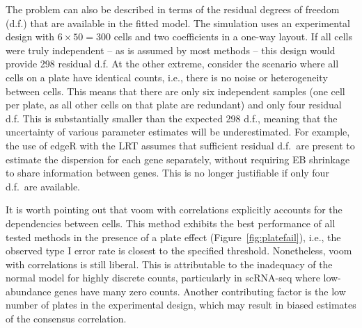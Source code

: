 \documentclass[oupdraft]{bio}
\begin{document}
The problem can also be described in terms of the residual degrees of freedom (d.f.) that are available in the fitted model.
The simulation uses an experimental design with $6 \times 50 =  300$ cells and two coefficients in a one-way layout.
If all cells were truly independent -- as is assumed by most methods -- this design would provide 298 residual d.f. 
At the other extreme, consider the scenario where all cells on a plate have identical counts, i.e., there is no noise or heterogeneity between cells.
This means that there are only six independent samples (one cell per plate, as all other cells on that plate are redundant) and only four residual d.f.
This is substantially smaller than the expected 298 d.f., meaning that the uncertainty of various parameter estimates will be underestimated.
For example, the use of edgeR with the LRT assumes that sufficient residual d.f.\ are present to estimate the dispersion for each gene separately,
    without requiring EB shrinkage to share information between genes.
This is no longer justifiable if only four d.f.\ are available.

It is worth pointing out that voom with correlations explicitly accounts for the dependencies between cells.
This method exhibits the best performance of all tested methods in the presence of a plate effect (Figure~\ref{fig:platefail}),
    i.e., the observed type I error rate is closest to the specified threshold.
Nonetheless, voom with correlations is still liberal.
This is attributable to the inadequacy of the normal model for highly discrete counts, particularly in scRNA-seq where low-abundance genes have many zero counts.
Another contributing factor is the low number of plates in the experimental design, which may result in biased estimates of the consensus correlation.
\end{document}

